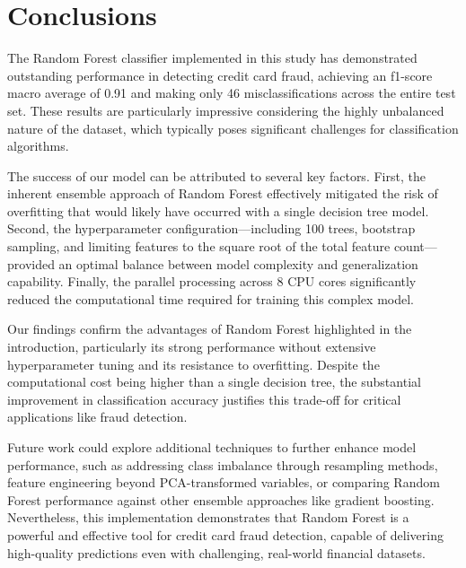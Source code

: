 \documentclass[10pt]{article}
\begin{document}
\section{Conclusions}
The Random Forest classifier implemented in this study has demonstrated outstanding performance in detecting credit card fraud, achieving an f1-score macro average of 0.91 and making only 46 misclassifications across the entire test set. These results are particularly impressive considering the highly unbalanced nature of the dataset, which typically poses significant challenges for classification algorithms. \par
The success of our model can be attributed to several key factors. First, the inherent ensemble approach of Random Forest effectively mitigated the risk of overfitting that would likely have occurred with a single decision tree model. Second, the hyperparameter configuration—including 100 trees, bootstrap sampling, and limiting features to the square root of the total feature count—provided an optimal balance between model complexity and generalization capability. Finally, the parallel processing across 8 CPU cores significantly reduced the computational time required for training this complex model. \par
Our findings confirm the advantages of Random Forest highlighted in the introduction, particularly its strong performance without extensive hyperparameter tuning and its resistance to overfitting. Despite the computational cost being higher than a single decision tree, the substantial improvement in classification accuracy justifies this trade-off for critical applications like fraud detection. \par
Future work could explore additional techniques to further enhance model performance, such as addressing class imbalance through resampling methods, feature engineering beyond PCA-transformed variables, or comparing Random Forest performance against other ensemble approaches like gradient boosting. Nevertheless, this implementation demonstrates that Random Forest is a powerful and effective tool for credit card fraud detection, capable of delivering high-quality predictions even with challenging, real-world financial datasets.



\end{document}
